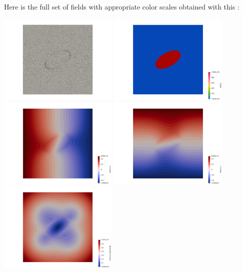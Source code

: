 Here is the full set of fields with appropriate color scales obtained with 
this \stone:
\begin{center}
\includegraphics[width=5.7cm]{python_codes/fieldstone_142/results/case2/mesh}
\includegraphics[width=5.7cm]{python_codes/fieldstone_142/results/case2/eta}\\
\includegraphics[width=5.7cm]{python_codes/fieldstone_142/results/case2/u}
\includegraphics[width=5.7cm]{python_codes/fieldstone_142/results/case2/v}
\includegraphics[width=5.7cm]{python_codes/fieldstone_142/results/case2/vel}\\

\end{center}
